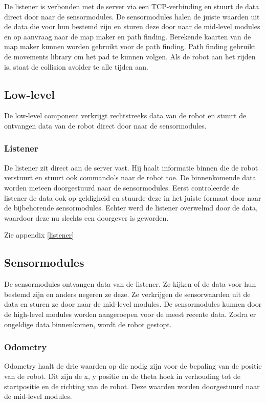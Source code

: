 \documentclass[a4paper,10pt]{article}
\begin{document}
De listener is verbonden met de server via een TCP-verbinding en stuurt de data direct door naar de sensormodules. De sensormodules halen de juiste waarden uit de data die voor hun bestemd zijn en sturen deze door naar de mid-level modules en op aanvraag naar de map maker en path finding. Berekende kaarten van de map maker kunnen worden gebruikt voor de path finding. Path finding gebruikt de movements library om het pad te kunnen volgen. Als de robot aan het rijden is, staat de collision avoider te alle tijden aan.

\subsection{Low-level}
De low-level component verkrijgt rechtstreeks data van de robot en stuurt de ontvangen data van de robot direct door naar de sensormodules.

\subsubsection{Listener}
De listener zit direct aan de server vast. Hij haalt informatie binnen die de robot verstuurt en stuurt ook commando's naar de robot toe. De binnenkomende data worden meteen doorgestuurd naar de sensormodules. Eerst controleerde de listener de data ook op geldigheid en stuurde deze in het juiste formaat door naar de bijbehorende sensormodules. Echter werd de listener overwelmd door de data, waardoor deze nu slechts een doorgever is geworden.

Zie appendix \ref{listener}

\subsection{Sensormodules}
De sensormodules ontvangen data van de listener. Ze kijken of de data voor hun bestemd zijn en anders negeren ze deze. Ze verkrijgen de sensorwaarden uit de data en sturen ze door naar de mid-level modules. De sensormodules kunnen door de high-level modules worden aangeroepen voor de meest recente data. Zodra er ongeldige data binnenkomen, wordt de robot gestopt.

\subsubsection{Odometry}
Odometry haalt de drie waarden op die nodig zijn voor de bepaling van de positie van de robot. Dit zijn de x, y positie en de theta hoek in verhouding tot de startpositie en de richting van de robot. Deze waarden worden doorgestuurd naar de mid-level modules.
\end{document}
